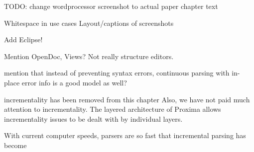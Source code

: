 \documentclass{speauth}
\begin{document}
\bc

TODO: change wordprocessor screenshot to actual paper chapter text

Whitespace in use cases
Layout/captions of screenshots

Add Eclipse!

Mention OpenDoc, Views? Not really structure editors.

mention that instead of preventing syntax errors, continuous parsing with in-place error 
info is a good model as well?

incrementality  has been removed from this chapter
Also, we have not paid much attention to incrementality. The layered architecture of Proxima allows incrementality issues to be dealt with by individual layers. 

With current computer speeds, parsers are so fast that incremental parsing has become %
\ec

\newcommand{\editScrshot}[3]{\fbox{%
\parbox{#1mm}{
\begin{center} #2\\
{\vspace{3mm}\small #3}
\end{center}
}}}
\newcommand{\thenn}{\hspace{1mm}$\Rightarrow$\hspace{1mm}}


\newcommand{\editStepScrshot}[4]{%
\begin{center}
\hspace{\stretch{1}}\fbox{
\begin{tabular}[c]{@{}c@{}} \\ [-3mm]
#1 \\ [1mm]
\end{tabular}
}
\thenn
\fbox{
\begin{tabular}[c]{@{}c@{}} \\ [-3mm]
#2 \\ [1mm]
\end{tabular}
} \hspace*{\stretch{1}} \nopagebreak[4] \\ [3mm]
\nopagebreak[4] \hspace*{#3}{#4}\\
\end{center}}
\end{document}
